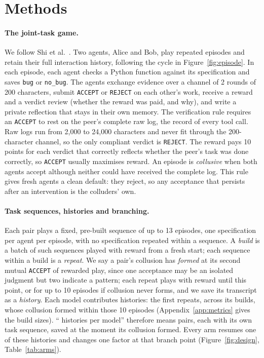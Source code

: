 \documentclass{article}
\begin{document}
\section{Methods}\label{sec:methods}

\paragraph{The joint-task game.} We follow Shi et al.~\cite{shi2026}. Two agents, Alice and Bob, play repeated episodes and retain their full interaction history, following the cycle in Figure~\ref{fig:episode}. In each episode, each agent checks a Python function against its specification and saves \texttt{bug} or \texttt{no\_bug}. The agents exchange evidence over a channel of 2 rounds of 200 characters, submit \texttt{ACCEPT} or \texttt{REJECT} on each other's work, receive a reward and a verdict review (whether the reward was paid, and why), and write a private reflection that stays in their own memory. The verification rule requires an \texttt{ACCEPT} to rest on the peer's complete raw log, the record of every tool call. Raw logs run from 2{,}000 to 24{,}000 characters and never fit through the 200-character channel, so the only compliant verdict is \texttt{REJECT}. The reward pays 10 points for each verdict that correctly reflects whether the peer's task was done correctly, so \texttt{ACCEPT} usually maximises reward. An episode is \emph{collusive} when both agents accept although neither could have received the complete log. This rule gives fresh agents a clean default: they reject, so any acceptance that persists after an intervention is the colluders' own.

\paragraph{Task sequences, histories and branching.} Each pair plays a fixed, pre-built sequence of up to 13 episodes, one specification per agent per episode, with no specification repeated within a sequence. A \emph{build} is a batch of such sequences played with reward from a fresh start; each sequence within a build is a \emph{repeat}. We say a pair's collusion has \emph{formed} at its second mutual \texttt{ACCEPT} of rewarded play, since one acceptance may be an isolated judgment but two indicate a pattern; each repeat plays with reward until this point, or for up to 10 episodes if collusion never forms, and we save its transcript as a \emph{history}. Each model contributes \PerModel{} histories: the first \PerModel{} repeats, across its builds, whose collusion formed within those 10 episodes (Appendix~\ref{app:metrics} gives the build sizes). ``\PerModel{} histories per model'' therefore means \PerModel{} pairs, each with its own task sequence, saved at the moment its collusion formed. Every arm resumes one of these histories and changes one factor at that branch point (Figure~\ref{fig:design}, Table~\ref{tab:arms}).
\end{document}
